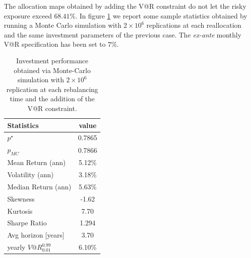 The allocation maps obtained by adding the V@R constraint do not let the risky exposure exceed $68.41\%$.
In figure \ref{tab:performance_VaRext1} we report some sample statistics obtained by running a Monte Carlo simulation with $2\times10^6$ replications at each reallocation and the same investment parameters of the previous case. The \textit{ex-ante} monthly V@R specification has been set to $7\%$. 
\begin{table}[]
	\centering
	\begin{tabular}{@{}lc@{}}
		\toprule
		Statistics & value  \\
		\midrule
		$p^{\star}$ & 0.7865\\
		\addlinespace[0.5em]	
		$p_{MC}$ & 0.7866\\
		\addlinespace[0.5em]
		Mean Return (ann) & 5.12\%\\
		\addlinespace[0.5em]
		Volatility (ann) & 3.18\%\\
		\addlinespace[0.5em]
		Median Return (ann) & 5.63\%\\
		\addlinespace[0.5em]
		Skewness & -1.62\\
		\addlinespace[0.5em]
		Kurtosis & 7.70\\
		\addlinespace[0.5em]
		Sharpe Ratio & 1.294\\
		\addlinespace[0.5em]
		Avg horizon [years] & 3.70 \\
		\addlinespace[0.5em]
		yearly $V@R^{0.99}_{0.01}$ & 6.10\%\\	
		\bottomrule
	\end{tabular}
	\caption{Investment performance obtained via Monte-Carlo simulation with $2\times10^6$ replication at each rebalancing time and the addition of the V@R constraint.}
	\label{tab:performance_VaRext1}
\end{table}
